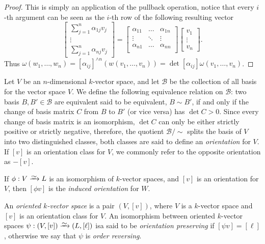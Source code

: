 \begin{proof}
This is simply an application of the pullback operation, notice that every
\(i\)-th argument can be seen as the \(i\)-th row of the following resulting
vector
\[
  \begin{bmatrix}
    \sum_{j=1}^n \alpha_{1 j} v_j \\ \vdots \\ \sum_{j=1}^n \alpha_{n j} v_j
  \end{bmatrix}
  =
  \begin{bmatrix}
    \alpha_{11} &\dots &\alpha_{1n} \\
    \vdots &\ddots &\vdots \\
    \alpha_{n1} &\dots &\alpha_{nn} \\
  \end{bmatrix}
  \begin{bmatrix}
    v_1 \\ \vdots \\ v_n
  \end{bmatrix}.
\]
Thus \(\omega(w_1, \dots, w_n) = [\alpha_{ij}]^{\wedge n}(w(v_{1}, \dots, v_n))
= \det [\alpha_{ij}] \omega(v_1, \dots, v_n)\).
\end{proof}

\begin{definition}[Orientation]
\label{def:orientation}
Let \(V\) be an \(n\)-dimensional \(k\)-vector space, and let \(\mathcal B\) be
the collection of all basis for the vector space \(V\). We define the following
equivalence relation on \(\mathcal B\): two basis \(B, B' \in \mathcal B\) are
equivalent said to be equivalent, \(B \sim B'\), if and only if the change of
basis matrix \(C\) from \(B\) to \(B'\) (or vice versa) has \(\det C >
0\). Since every change of basis matrix is an isomorphism, \(\det C\) can only
be either strictly positive or strictly negative, therefore, the quotient
\(\mathcal B/{\sim}\) splits the basis of \(V\) into two distinguished classes,
both classes are said to define an \emph{orientation} for \(V\). If \([v]\) is
an orientation class for \(V\), we commonly refer to the opposite orientation
as \(-[v]\).

If \(\phi: V \isoto L\) is an isomorphism of \(k\)-vector spaces, and \([v]\) is
an orientation for \(V\), then \([\phi v]\) is the \emph{induced orientation}
for \(W\).

An \emph{oriented \(k\)-vector space} is a pair \((V, [v])\), where \(V\) is a
\(k\)-vector space and \([v]\) is an orientation class for \(V\). An isomorphism
between oriented \(k\)-vector spaces \(\psi: (V, [v]) \isoto (L, [\ell])\) isa
said to be \emph{orientation preserving} if \([\psi v] = [\ell]\), otherwise we
say that \(\psi\) is \emph{order reversing}.
\end{definition}

